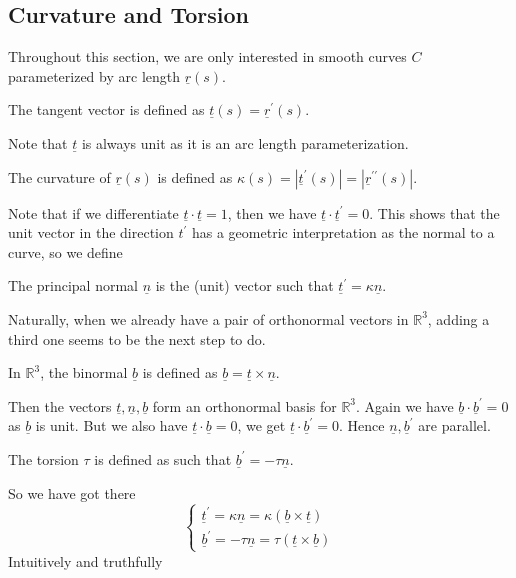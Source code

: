 \subsection{Curvature and Torsion}
Throughout this section, we are only interested in smooth curves $C$ parameterized by arc length $\underline{r}(s)$.
\begin{definition}
    The tangent vector is defined as $\underline{t}(s)=\underline{r}^\prime(s)$.
\end{definition}
Note that $\underline{t}$ is always unit as it is an arc length parameterization.
\begin{definition}
    The curvature of $\underline{r}(s)$ is defined as $\kappa(s)=|\underline{t}^\prime(s)|=|\underline{r}^{\prime\prime}(s)|$.
\end{definition}
Note that if we differentiate $\underline{t}\cdot\underline{t}=1$, then we have $\underline{t}\cdot\underline{t}^\prime=0$.
This shows that the unit vector in the direction $t^\prime$ has a geometric interpretation as the normal to a curve, so we define
\begin{definition}
    The principal normal $\underline{n}$ is the (unit) vector such that $\underline{t}^\prime=\kappa\underline{n}$.
\end{definition}
Naturally, when we already have a pair of orthonormal vectors in $\mathbb R^3$, adding a third one seems to be the next step to do.
\begin{definition}
    In $\mathbb R^3$, the binormal $\underline{b}$ is defined as $\underline{b}=\underline{t}\times\underline{n}$.
\end{definition}
Then the vectors $\underline{t},\underline{n},\underline{b}$ form an orthonormal basis for $\mathbb R^3$.
Again we have $\underline{b}\cdot\underline{b}^\prime=0$ as $\underline{b}$ is unit.
But we also have $\underline{t}\cdot\underline{b}=0$, we get $\underline{t}\cdot\underline{b}^\prime=0$.
Hence $\underline{n},\underline{b}^\prime$ are parallel.
\begin{definition}
    The torsion $\tau$ is defined as such that $\underline{b}^\prime=-\tau\underline{n}$.
\end{definition}
So we have got there
$$\begin{cases}
    \underline{t}^\prime=\kappa\underline{n}=\kappa(\underline{b}\times\underline{t})\\
    \underline{b}^\prime=-\tau\underline{n}=\tau(\underline{t}\times\underline{b})
\end{cases}$$
Intuitively and truthfully
